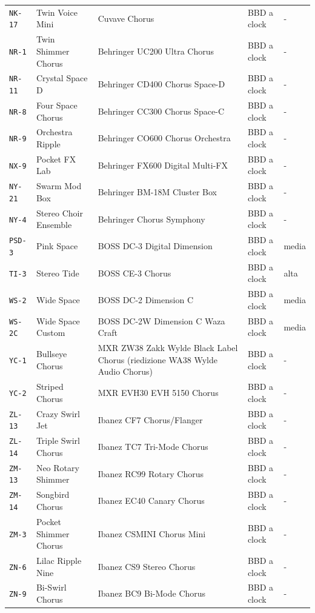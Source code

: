 \begin{xltabular}{\linewidth}{@{}l l X l l@{}}
\texttt{NK-17} & Twin Voice Mini & Cuvave Chorus & BBD a clock & -\\
\texttt{NR-1} & Twin Shimmer Chorus & Behringer UC200 Ultra Chorus & BBD a clock & -\\
\texttt{NR-11} & Crystal Space D & Behringer CD400 Chorus Space-D & BBD a clock & -\\
\texttt{NR-8} & Four Space Chorus & Behringer CC300 Chorus Space-C & BBD a clock & -\\
\texttt{NR-9} & Orchestra Ripple & Behringer CO600 Chorus Orchestra & BBD a clock & -\\
\texttt{NX-9} & Pocket FX Lab & Behringer FX600 Digital Multi-FX & BBD a clock & -\\
\texttt{NY-21} & Swarm Mod Box & Behringer BM-18M Cluster Box & BBD a clock & -\\
\texttt{NY-4} & Stereo Choir Ensemble & Behringer Chorus Symphony & BBD a clock & -\\
\texttt{PSD-3} & Pink Space & BOSS DC-3 Digital Dimension & BBD a clock & media\\
\texttt{TI-3} & Stereo Tide & BOSS CE-3 Chorus & BBD a clock & alta\\
\texttt{WS-2} & Wide Space & BOSS DC-2 Dimension C & BBD a clock & media\\
\texttt{WS-2C} & Wide Space Custom & BOSS DC-2W Dimension C Waza Craft & BBD a clock & media\\
\texttt{YC-1} & Bullseye Chorus & MXR ZW38 Zakk Wylde Black Label Chorus (riedizione WA38 Wylde Audio Chorus) & BBD a clock & -\\
\texttt{YC-2} & Striped Chorus & MXR EVH30 EVH 5150 Chorus & BBD a clock & -\\
\texttt{ZL-13} & Crazy Swirl Jet & Ibanez CF7 Chorus/Flanger & BBD a clock & -\\
\texttt{ZL-14} & Triple Swirl Chorus & Ibanez TC7 Tri-Mode Chorus & BBD a clock & -\\
\texttt{ZM-13} & Neo Rotary Shimmer & Ibanez RC99 Rotary Chorus & BBD a clock & -\\
\texttt{ZM-14} & Songbird Chorus & Ibanez EC40 Canary Chorus & BBD a clock & -\\
\texttt{ZM-3} & Pocket Shimmer Chorus & Ibanez CSMINI Chorus Mini & BBD a clock & -\\
\texttt{ZN-6} & Lilac Ripple Nine & Ibanez CS9 Stereo Chorus & BBD a clock & -\\
\texttt{ZN-9} & Bi-Swirl Chorus & Ibanez BC9 Bi-Mode Chorus & BBD a clock & -\\

\end{xltabular}
